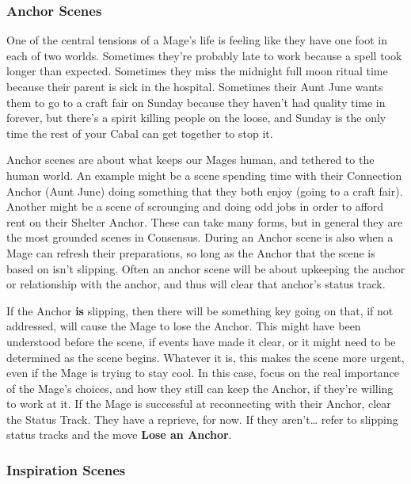 \documentclass[
  oneside,
  statementpaper,
  9pt]{memoir}
\begin{document}
\hypertarget{anchor-scenes}{%
\subsubsection{Anchor Scenes}\label{anchor-scenes}}

One of the central tensions of a Mage's life is feeling like they have
one foot in each of two worlds. Sometimes they're probably late to work
because a spell took longer than expected. Sometimes they miss the
midnight full moon ritual time because their parent is sick in the
hospital. Sometimes their Aunt June wants them to go to a craft fair on
Sunday because they haven't had quality time in forever, but there's a
spirit killing people on the loose, and Sunday is the only time the rest
of your Cabal can get together to stop it.

Anchor scenes are about what keeps our Mages human, and tethered to the
human world. An example might be a scene spending time with their
Connection Anchor (Aunt June) doing something that they both enjoy
(going to a craft fair). Another might be a scene of scrounging and
doing odd jobs in order to afford rent on their Shelter Anchor. These
can take many forms, but in general they are the most grounded scenes in
Consensus. During an Anchor scene is also when a Mage can refresh their
preparations, so long as the Anchor that the scene is based on isn't
slipping. Often an anchor scene will be about upkeeping the anchor or
relationship with the anchor, and thus will clear that anchor's status
track.

If the Anchor \textbf{is} slipping, then there will be something key
going on that, if not addressed, will cause the Mage to lose the Anchor.
This might have been understood before the scene, if events have made it
clear, or it might need to be determined as the scene begins. Whatever
it is, this makes the scene more urgent, even if the Mage is trying to
stay cool. In this case, focus on the real importance of the Mage's
choices, and how they still can keep the Anchor, if they're willing to
work at it. If the Mage is successful at reconnecting with their Anchor,
clear the Status Track. They have a reprieve, for now. If they
aren't\ldots{} refer to slipping status tracks and the move \textbf{Lose
an Anchor}.

\hypertarget{inspiration-scenes}{%
\subsubsection{Inspiration Scenes}\label{inspiration-scenes}}
\end{document}
